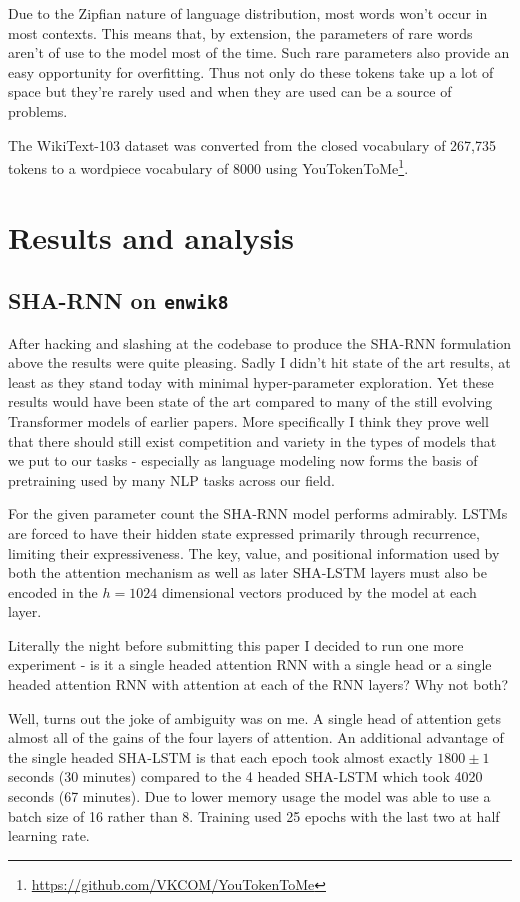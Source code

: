 \documentclass{article}
\newcommand{\enwik}{\texttt{enwik8}\xspace}
\begin{document}
Due to the Zipfian nature of language distribution, most words won't occur in most contexts.
This means that, by extension, the parameters of rare words aren't of use to the model most of the time.
Such rare parameters also provide an easy opportunity for overfitting.
Thus not only do these tokens take up a lot of space but they're rarely used and when they are used can be a source of problems.



The WikiText-103 dataset was converted from the closed vocabulary of 267,735 tokens to a wordpiece vocabulary of 8000 using YouTokenToMe\footnote{\url{https://github.com/VKCOM/YouTokenToMe}}.


\section{Results and analysis}

\subsection{SHA-RNN on \enwik}

After hacking and slashing at the codebase to produce the SHA-RNN formulation above the results were quite pleasing.
Sadly I didn't hit state of the art results, at least as they stand today with minimal hyper-parameter exploration.
Yet these results would have been state of the art compared to many of the still evolving Transformer models of earlier papers.
More specifically I think they prove well that there should still exist competition and variety in the types of models that we put to our tasks - especially as language modeling now forms the basis of pretraining used by many NLP tasks across our field.

For the given parameter count the SHA-RNN model performs admirably.
LSTMs are forced to have their hidden state expressed primarily through recurrence, limiting their expressiveness.
The key, value, and positional information used by both the attention mechanism as well as later SHA-LSTM layers must also be encoded in the $h=1024$ dimensional vectors produced by the model at each layer.


Literally the night before submitting this paper I decided to run one more experiment - is it a single headed attention RNN with a single head or a single headed attention RNN with attention at each of the RNN layers?
Why not both?

Well, turns out the joke of ambiguity was on me.
A single head of attention gets almost all of the gains of the four layers of attention.
An additional advantage of the single headed SHA-LSTM is that each epoch took almost exactly $1800 \pm 1$ seconds (30 minutes) compared to the 4 headed SHA-LSTM which took 4020 seconds (67 minutes).
Due to lower memory usage the model was able to use a batch size of 16 rather than 8.
Training used 25 epochs with the last two at half learning rate.
\end{document}
